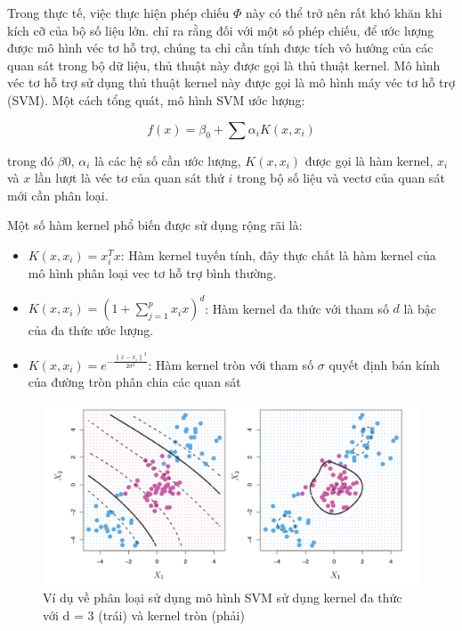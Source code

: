 \documentclass[a4paper]{report}\usepackage[]{graphicx}\usepackage[]{color}
\begin{document}
Trong thực tế, việc thực hiện phép chiếu $\Phi$ này có thể trở nên rất khó khăn khi kích cỡ của bộ số liệu lớn. \textcite{scholkopf1999advances} chỉ ra rằng đối với một số phép chiếu, để ước lượng được mô hình véc tơ hỗ trợ, chúng ta chỉ cần tính được tích vô hướng của các quan sát trong bộ dữ liệu, thủ thuật này được gọi là thủ thuật kernel. Mô hình véc tơ hỗ trợ sử dụng thủ thuật kernel này được gọi là mô hình máy véc tơ hỗ trợ (SVM). Một cách tổng quát, mô hình SVM ước lượng:

$$
f(x) = \beta_0 + \sum\alpha_i K(x, x_i)
$$

trong đó $\beta0$, $\alpha_i$ là các hệ số cần ước lượng, $K(x, x_i)$ được gọi là hàm kernel, $x_i$ và $x$ lần lượt là véc tơ của quan sát thứ $i$ trong bộ số liệu và vectơ của quan sát mới cần phân loại.

Một số hàm kernel phổ biến được sử dụng rộng rãi là:

\begin{itemize}
  \item{$K(x, x_i) = x_i^T x$}: Hàm kernel tuyến tính, đây thực chất là hàm kernel của mô hình phân loại vec tơ hỗ trợ bình thường.
  \item{$K(x, x_i) =  (1 + \sum_{j = 1}^p x_i x)^d$}: Hàm kernel đa thức với tham số $d$ là bậc của đa thức ước lượng.
  \item{$K(x, x_i) = e^{-\frac{{\|x - x_i\|}^2}{2 \sigma^2}}$}: Hàm kernel tròn với tham số $\sigma$ quyết định bán kính của đường tròn phân chia các quan sát
\end{itemize}

\begin{figure}
  \centering
    \includegraphics[width=\textwidth]{./Figures/svm_kernel_example.png}
  \caption[Ví dụ về phân loại sử dụng mô hình SVM]{Ví dụ về phân loại sử dụng mô hình SVM sử dụng kernel đa thức với d = 3 (trái) và kernel tròn (phải)}
  \label{fig:svm_kernel_example}
\end{figure}
\end{document}

